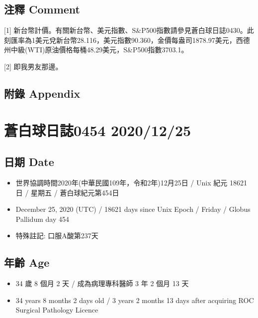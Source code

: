 \documentclass[
]{article}
\providecommand{\tightlist}{%
  \setlength{\itemsep}{0pt}\setlength{\parskip}{0pt}}
\begin{document}
\hypertarget{ux6ce8ux91cb-comment-23}{%
\subsection{注釋 Comment}\label{ux6ce8ux91cb-comment-23}}

{[}1{]}
新台幣計價。有關新台幣、美元指數、S\&P500指數請參見蒼白球日誌0430。此刻匯率為1美元兌新台幣28.116，美元指數90.360，金價每盎司1878.97美元，西德州中級(WTI)原油價格每桶48.29美元，S\&P500指數3703.1。

{[}2{]} 即我男友那邊。

\hypertarget{ux9644ux9304-appendix-23}{%
\subsection{附錄 Appendix}\label{ux9644ux9304-appendix-23}}

\hypertarget{ux84bcux767dux7403ux65e5ux8a8c0454-20201225}{%
\section{蒼白球日誌0454
2020/12/25}\label{ux84bcux767dux7403ux65e5ux8a8c0454-20201225}}

\hypertarget{ux65e5ux671f-date-24}{%
\subsection{日期 Date}\label{ux65e5ux671f-date-24}}

\begin{itemize}
\tightlist
\item
  世界協調時間2020年(中華民國109年，令和2年)12月25日 / Unix 紀元 18621
  日 / 星期五 / 蒼白球紀元第454日
\item
  December 25, 2020 (UTC) / 18621 days since Unix Epoch / Friday /
  Globus Pallidum day 454
\item
  特殊註記: 口服A酸第237天
\end{itemize}

\hypertarget{ux5e74ux9f61-age-24}{%
\subsection{年齡 Age}\label{ux5e74ux9f61-age-24}}

\begin{itemize}
\tightlist
\item
  34 歲 8 個月 2 天 / 成為病理專科醫師 3 年 2 個月 13 天
\item
  34 years 8 months 2 days old / 3 years 2 months 13 days after
  acquiring ROC Surgical Pathology Licence
\end{itemize}
\end{document}
